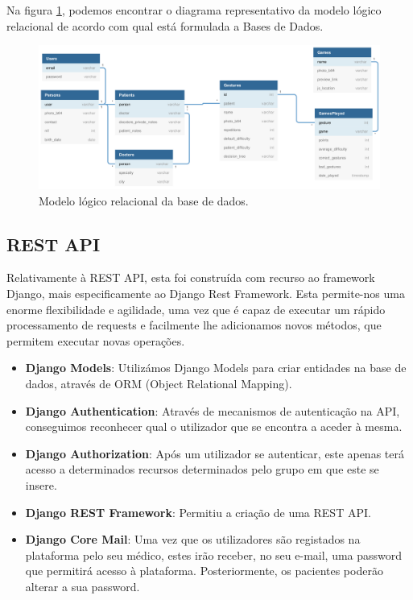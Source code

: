 \documentclass{TTUPhD}
\begin{document}
Na figura \ref{fig:bd_diagram}, podemos encontrar o diagrama representativo da modelo lógico relacional de acordo com qual está formulada a Bases de Dados.

\begin{figure}[h!]
    \center
    \includegraphics[scale=0.3]{./img/bd_diagram.png}
    \caption{Modelo lógico relacional da base de dados.}
    \label{fig:bd_diagram}
\end{figure}

\subsection{REST API}

Relativamente à REST API, esta foi construída com recurso ao framework Django, mais especificamente ao Django Rest Framework. Esta permite-nos uma enorme flexibilidade e agilidade, uma vez que é capaz de executar um rápido processamento de requests e facilmente lhe adicionamos novos métodos, que permitem executar novas operações.

\begin{itemize}
    \item \textbf{Django Models}: Utilizámos Django Models para criar entidades na base de dados, através de ORM (Object Relational Mapping).
    \item \textbf{Django Authentication}: Através de mecanismos de autenticação na API, conseguimos reconhecer qual o utilizador que se encontra a aceder à mesma.
    \item \textbf{Django Authorization}: Após um utilizador se autenticar, este apenas terá acesso a determinados recursos determinados pelo grupo em que este se insere.
    \item \textbf{Django REST Framework}: Permitiu a criação de uma REST API.
    \item \textbf{Django Core Mail}: Uma vez que os utilizadores são registados na plataforma pelo seu médico, estes irão receber, no seu e-mail, uma password que permitirá acesso à plataforma. Posteriormente, os pacientes poderão alterar a sua password.
\end{itemize}
\end{document}
